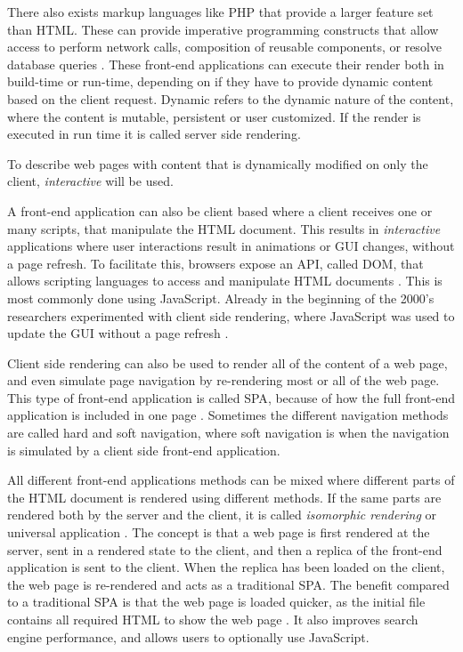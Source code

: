 There also exists markup languages like PHP that provide a larger feature set than \ac{HTML}. These can provide imperative programming constructs that allow access to perform network calls, composition of reusable components, or resolve database queries \cite{Royappa2000}. These front-end applications can execute their render both in build-time or run-time, depending on if they have to provide dynamic content based on the client request. Dynamic refers to the dynamic nature of the content, where the content is mutable, persistent or user customized. If the render is executed in run time it is called server side rendering.


To describe web pages with content that is dynamically modified on only the client, \textit{interactive} will be used.

A front-end application can also be client based where a client receives one or many scripts, that manipulate the \ac{HTML} document. This results in \textit{interactive} applications where user interactions result in animations or GUI changes, without a page refresh. To facilitate this, browsers expose an API, called \ac{DOM}, that allows scripting languages to access and manipulate \ac{HTML} documents \cite{Apparao1998}. This is most commonly done using JavaScript. Already in the beginning of the 2000's researchers experimented with client side rendering, where JavaScript was used to update the \ac{GUI} without a page refresh \cite{Betz2000}.

Client side rendering can also be used to render all of the content of a web page, and even simulate page navigation by re-rendering most or all of the web page. This type of front-end application is called \ac{SPA}, because of how the full front-end application is included in one page \cite{Mesbah2007}. Sometimes the different navigation methods are called hard and soft navigation, where soft navigation is when the navigation is simulated by a client side front-end application.

All different front-end applications methods can be mixed where different parts of the \ac{HTML} document is rendered using different methods. If the same parts are rendered both by the server and the client, it is called \textit{isomorphic rendering} \cite{Brehm2013} or universal application \cite{alabes2017isomorphic}. The concept is that a web page is first rendered at the server, sent in a rendered state to the client, and then a replica of the front-end application is sent to the client. When the replica has been loaded on the client, the web page is re-rendered and acts as a traditional \ac{SPA}. The benefit compared to a traditional \ac{SPA} is that the web page is loaded quicker, as the initial file contains all required \ac{HTML} to show the web page \cite{Brehm2013}. It also improves search engine performance, and allows users to optionally use JavaScript\cite{Brehm2013}.

